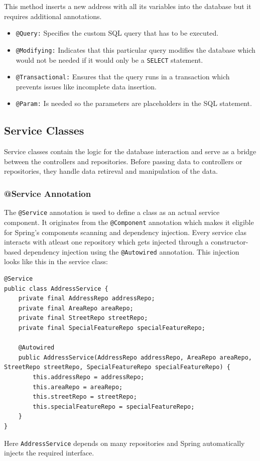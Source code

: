     This method inserts a new address with all its variables into the database but it requires additional annotations.
    \begin{itemize}
        \item \texttt{@Query:} Specifies the custom SQL query that has to be executed.
        \item \texttt{@Modifying:} Indicates that this particular query modifies the database which would not be needed if it would only be a \texttt{SELECT} statement.
        \item \texttt{@Transactional:} Ensures that the query runs in a transaction which prevents issues like incomplete data insertion.
        \item \texttt{@Param:} Is needed so the parameters are placeholders in the SQL statement.
    \end{itemize}

    \subsection{Service Classes}
    Service classes contain the logic for the database interaction and serve as a bridge between the controllers and repositories. Before passing data to controllers or repositories, they handle data retireval and manipulation of the data.

    \subsubsection{@Service Annotation}
    The \texttt{@Service} annotation is used to define a class as an actual service component. It originates from the \texttt{@Component} annotation which makes it eligible for Spring's components scanning and dependency injection. \newline
    Every service clas interacts with atleast one repository which gets injected through a constructor-based dependency injection using the \texttt{@Autowired} annotation. This injection looks like this in the service class: 
    \lstset{style=mycsharp, caption=Repository Injection and @Service}
    \begin{lstlisting}
@Service
public class AddressService {        
    private final AddressRepo addressRepo;
    private final AreaRepo areaRepo;
    private final StreetRepo streetRepo;
    private final SpecialFeatureRepo specialFeatureRepo;

    @Autowired
    public AddressService(AddressRepo addressRepo, AreaRepo areaRepo, StreetRepo streetRepo, SpecialFeatureRepo specialFeatureRepo) {
        this.addressRepo = addressRepo;
        this.areaRepo = areaRepo;
        this.streetRepo = streetRepo;
        this.specialFeatureRepo = specialFeatureRepo;
    }
}
    \end{lstlisting}
    Here \texttt{AddressService} depends on many repositories and Spring automatically injects the required interface. 

